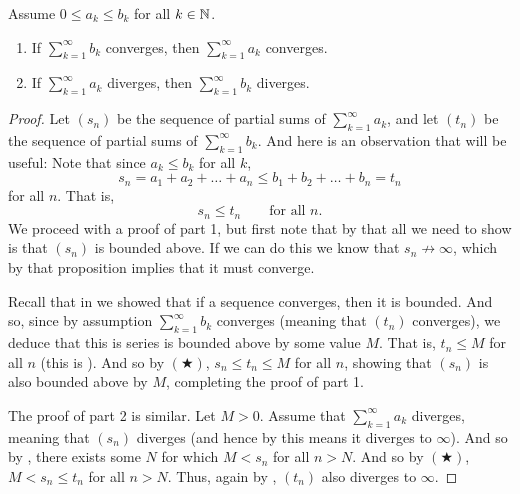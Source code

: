 \begin{proposition}
  Assume $0 \leq a_k \leq b_k$ for all $k \in \mathbb N$.
  \begin{enumerate}
    \item If $\sum_{k = 1}^{\infty} b_k$ converges, then $\sum_{k =
      1}^{\infty} a_k$ converges.
    \item If $\sum_{k = 1}^{\infty} a_k$ diverges, then $\sum_{k =
      1}^{\infty} b_k$ diverges.
  \end{enumerate}
\end{proposition}

\begin{proof}
  Let $(s_n)$ be the sequence of partial sums of $\sum_{k =
  1}^{\infty} a_k$, and let $(t_n)$ be the sequence of partial sums
  of $\sum_{k = 1}^{\infty} b_k$. And here is an observation that
  will be useful:
  Note that since $a_k \leq b_k$ for all $k$,
  \[ s_n = a_1 + a_2 + \dots + a_n \leq b_1 + b_2 + \dots + b_n = t_n \]
  for all $n$. That is,
  \[ s_n \leq t_n \qquad \text{for all $n$.} \tag{$\bigstar$} \]
  We proceed with a proof of part 1, but first note that by
   that all we need to show
  is that $(s_n)$ is bounded above. If we can do this we know that
  $s_n \not\to \infty$, which by that proposition implies that it
  must converge.

  Recall that in  we showed that
  if a sequence converges, then it is bounded. And so, since by
  assumption $\sum_{k = 1}^{\infty} b_k$ converges (meaning that
  $(t_n)$ converges), we deduce that this is series is bounded above
  by some value $M$. That is, $t_n \leq M$ for all $n$ (this is
  ). And so by $(\bigstar)$, $s_n \leq t_n
  \leq M$ for all $n$, showing that $(s_n)$ is also bounded above by
  $M$, completing the proof of part 1.

  The proof of part 2 is similar. Let $M > 0$. Assume that $\sum_{k =
  1}^{\infty} a_k$ diverges, meaning that $(s_n)$ diverges (and hence
    by  this means it diverges
  to $\infty$). And so by , there exists
  some $N$ for which $M < s_n$ for all $n > N$. And so by
  $(\bigstar)$, $M < s_n \leq t_n$ for all $n > N$. Thus, again
  by , $(t_n)$ also diverges to $\infty$.
\end{proof}

